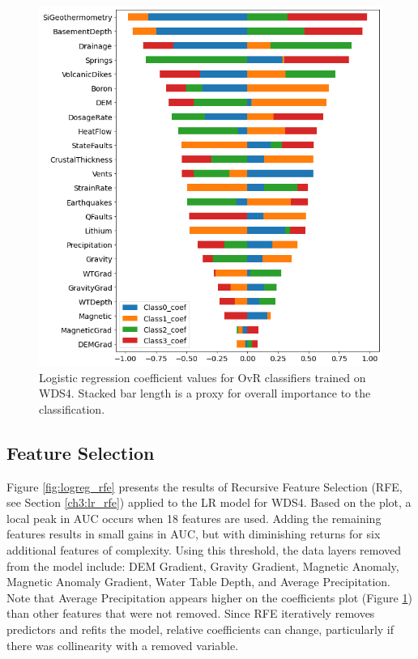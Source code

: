 \begin{figure}%
\centering
\includegraphics[width=\textwidth]{templates/images/Figure-LR-coefficients.png}
\singlespacing
\caption[Logistic regression feature coefficients]{Logistic regression coefficient values for OvR classifiers trained on WDS4. Stacked bar length is a proxy for overall importance to the classification.}
\label{fig:logreg_coefs}
\end{figure}

\subsection{Feature Selection} \label{ch5:lr_feature_selection}
Figure \ref{fig:logreg_rfe} presents the results of Recursive Feature Selection (RFE, see Section \ref{ch3:lr_rfe}) applied to the LR model for WDS4. Based on the plot, a local peak in AUC occurs when 18 features are used. Adding the remaining features results in small gains in AUC, but with diminishing returns for six additional features of complexity. Using this threshold, the data layers removed from the model include: DEM Gradient, Gravity Gradient, Magnetic Anomaly, Magnetic Anomaly Gradient, Water Table Depth, and Average Precipitation. Note that Average Precipitation appears higher on the coefficients plot (Figure \ref{fig:logreg_coefs}) than other features that were not removed. Since RFE iteratively removes predictors and refits the model, relative coefficients can change, particularly if there was collinearity with a removed variable.

